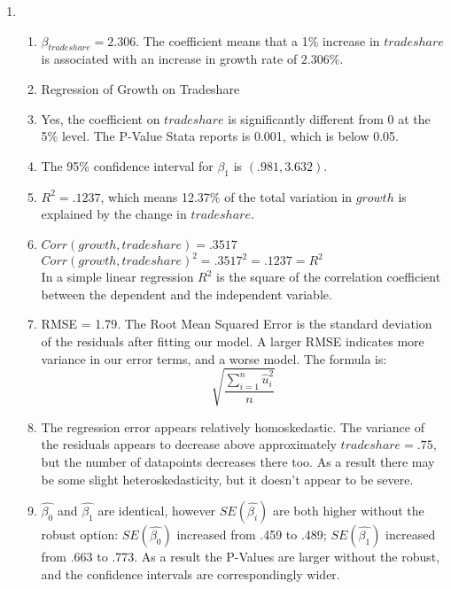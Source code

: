 \documentclass[12pt]{chmullighw}
\begin{document}
\begin{enumerate}
\item \begin{enumerate}
	\item $\beta_{tradeshare} = 2.306$. The coefficient means that a 1\% increase in $tradeshare$ is associated with an increase in growth rate of $2.306\%$.

	\item Regression of Growth on Tradeshare \\

	\item Yes, the coefficient on $tradeshare$ is significantly different from 0 at the 5\% level. The P-Value Stata reports is 0.001, which is below 0.05.
	
	\item The 95\% confidence interval for $\beta_1$ is $(.981, 3.632)$.
	
	\item $R^2 = .1237$, which means 12.37\% of the total variation in $growth$ is explained by the change in $tradeshare$.
	
	\item $Corr(growth, tradeshare) = .3517$ \\
		$Corr(growth, tradeshare)^2 = .3517^2 = .1237 = R^2$ \\
		In a simple linear regression $R^2$ is the square of the correlation coefficient between the dependent and the independent variable.
		
	\item RMSE = 1.79. The Root Mean Squared Error is the standard deviation of the residuals after fitting our model. A larger RMSE indicates more variance in our error terms, and a worse model. The formula is:
	$$\sqrt{\frac{\sum_{i=1}^n \hat{u}_i^2}{n}}$$
	
	\item The regression error appears relatively homoskedastic. The variance of the residuals appears to decrease above approximately $tradeshare = .75$, but the number of datapoints decreases there too. As a result there may be some slight heteroskedasticity, but it doesn't appear to be severe.
	
	\item $\hat{\beta_0}$ and $\hat{\beta_1}$ are identical, however $SE(\hat{\beta_i})$ are both higher without the robust option: $SE(\hat{\beta_0})$ increased from .459 to .489; $SE(\hat{\beta_1})$ increased from .663 to .773. As a result the P-Values are larger without the robust, and the confidence intervals are correspondingly wider.
	

\end{enumerate}
\end{enumerate}
\end{document}
